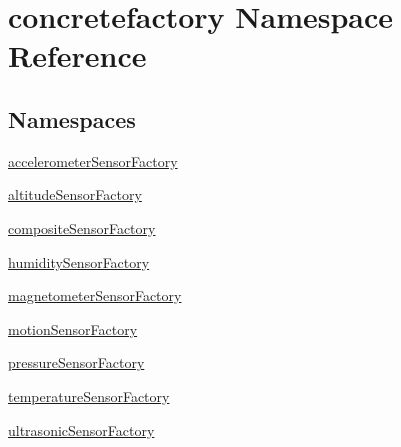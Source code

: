 \hypertarget{namespaceconcretefactory}{}\section{concretefactory Namespace Reference}
\label{namespaceconcretefactory}
\subsection*{Namespaces}
\begin{DoxyCompactItemize}
\item 
 \hyperlink{namespaceconcretefactory_1_1accelerometerSensorFactory}{accelerometer\+Sensor\+Factory}
\item 
 \hyperlink{namespaceconcretefactory_1_1altitudeSensorFactory}{altitude\+Sensor\+Factory}
\item 
 \hyperlink{namespaceconcretefactory_1_1compositeSensorFactory}{composite\+Sensor\+Factory}
\item 
 \hyperlink{namespaceconcretefactory_1_1humiditySensorFactory}{humidity\+Sensor\+Factory}
\item 
 \hyperlink{namespaceconcretefactory_1_1magnetometerSensorFactory}{magnetometer\+Sensor\+Factory}
\item 
 \hyperlink{namespaceconcretefactory_1_1motionSensorFactory}{motion\+Sensor\+Factory}
\item 
 \hyperlink{namespaceconcretefactory_1_1pressureSensorFactory}{pressure\+Sensor\+Factory}
\item 
 \hyperlink{namespaceconcretefactory_1_1temperatureSensorFactory}{temperature\+Sensor\+Factory}
\item 
 \hyperlink{namespaceconcretefactory_1_1ultrasonicSensorFactory}{ultrasonic\+Sensor\+Factory}
\end{DoxyCompactItemize}
